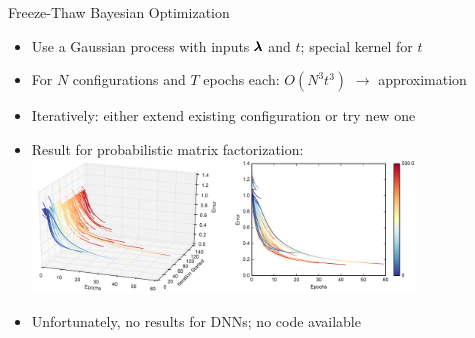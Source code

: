 \begin{frame}{Freeze-Thaw Bayesian Optimization }
\begin{itemize}
	\item Use a Gaussian process with inputs $\pmb{\lambda}$ and $t$; special kernel for $t$
	\item For $N$ configurations and $T$ epochs each: $O(N^3 t^3)$ $\rightarrow$ approximation
	\item Iteratively: either extend existing configuration or try new one
\pause
	\item Result for probabilistic matrix factorization:
	\includegraphics[width=0.8\textwidth]{../w07_hpo_speedup/images/learningcurve/FTBO.png}
\pause
	\item Unfortunately, no results for DNNs; no code available
\end{itemize}


\end{frame}





